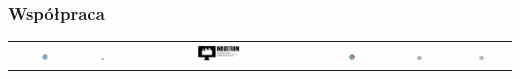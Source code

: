 \documentclass[ucs]{beamer}
\begin{document}
\begin{frame}
\frametitle{Współpraca}
\begin{center}
\begin{tabular}{cccccc}
\includegraphics[width=0.1\textwidth]{images/AEiILogo} &
\includegraphics[width=0.1\textwidth]{images/IILogo} &
\includegraphics[width=0.25\textwidth]{images/SKNIndustrumLogo} &
\includegraphics[width=0.1\textwidth]{images/WISiELogo} &
\includegraphics[width=0.1\textwidth]{images/IMIUELogo} &
\includegraphics[width=0.1\textwidth]{images/ZKiWPLogo} \\ 
\end{tabular} 
\end{center}


\end{frame}
\end{document}
